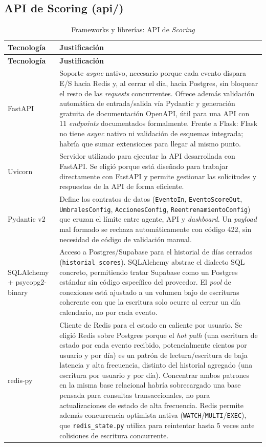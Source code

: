 \subsection{API de Scoring (api/)}
\begin{longtable}{p{3cm}p{11.6cm}}
	\caption{Frameworks y librerías: API de \emph{Scoring}}
	\label{tab:frameworks-api}\\
	\hline
	\textbf{Tecnología} & \textbf{Justificación} \\
	\hline
	\endfirsthead
	\hline
	\textbf{Tecnología} & \textbf{Justificación} \\
	\hline
	\endhead
	FastAPI & Soporte \emph{async} nativo, necesario porque cada evento dispara E/S hacia Redis y, al cerrar el día, hacia Postgres, sin bloquear el resto de las \emph{requests} concurrentes. Ofrece además validación automática de entrada/salida vía Pydantic y generación gratuita de documentación OpenAPI, útil para una API con 11 \emph{endpoints} documentados formalmente. Frente a Flask: Flask no tiene \emph{async} nativo ni validación de esquemas integrada; habría que sumar extensiones para llegar al mismo punto. \\
	\hline
	Uvicorn & Servidor utilizado para ejecutar la API desarrollada con FastAPI. Se eligió porque está diseñado para trabajar directamente con FastAPI y permite gestionar las solicitudes y respuestas de la API de forma eficiente. \\
	\hline
	Pydantic v2 & Define los contratos de datos (\texttt{EventoIn}, \texttt{EventoScoreOut}, \texttt{UmbralesConfig}, \texttt{AccionesConfig}, \texttt{ReentrenamientoConfig}) que cruzan el límite entre agente, API y \emph{dashboard}. Un \emph{payload} mal formado se rechaza automáticamente con código 422, sin necesidad de código de validación manual. \\
	\hline
	SQLAlchemy + psycopg2-binary & Acceso a Postgres/Supabase para el historial de días cerrados (\texttt{historial\_scores}). SQLAlchemy abstrae el dialecto SQL concreto, permitiendo tratar Supabase como un Postgres estándar sin código específico del proveedor. El \emph{pool} de conexiones está ajustado a un volumen bajo de escrituras coherente con que la escritura solo ocurre al cerrar un día calendario, no por cada evento. \\
	\hline
	redis-py & Cliente de Redis para el estado en caliente por usuario. Se eligió Redis sobre Postgres porque el \emph{hot path} (una escritura de estado por cada evento recibido, potencialmente cientos por usuario y por día) es un patrón de lectura/escritura de baja latencia y alta frecuencia, distinto del historial agregado (una escritura por usuario y por día). Concentrar ambos patrones en la misma base relacional habría sobrecargado una base pensada para consultas transaccionales, no para actualizaciones de estado de alta frecuencia. Redis permite además concurrencia optimista nativa (\texttt{WATCH}/\texttt{MULTI}/\texttt{EXEC}), que \texttt{redis\_state.py} utiliza para reintentar hasta 5 veces ante colisiones de escritura concurrente. \\

\end{longtable}
